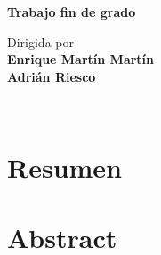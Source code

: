 \documentclass[11pt,a4paper]{article}
\begin{document}
\begin{frontmatter}
\vfill

\begin{center}
  {\Large \textbf{Trabajo fin de grado}}
\end{center}

\vfill

\begin{large}
\begin{center}
{Dirigida por}  \\ [0.3em]
\textbf{Enrique Martín Martín}\\[0.3em]
\textbf{Adrián Riesco}
\begin{large}
\begin{center}
\vspace{3ex}
\end{center}
\end{large}
\end{center}

\vfill

\end{large}

\newpage

\thispagestyle{empty}
\mbox{ }

\clearpage


%


\end{frontmatter}

%




\newpage

{\setlength{\parskip}{0.4cm plus4mm minus3mm}

\newpage
\section*{Resumen\label{sec:res}}


\newpage
\section*{Abstract\label{sec:abs}}

}
\end{document}
